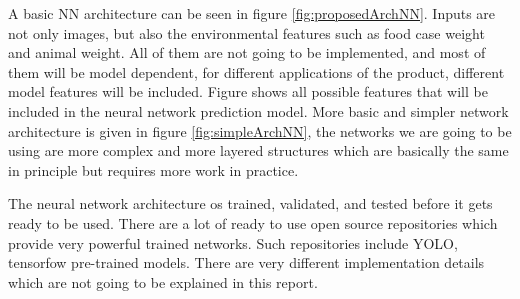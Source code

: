 A basic NN architecture can be seen in figure \ref{fig:proposedArchNN}. Inputs are not only images, but also the environmental features such as food case weight and animal weight. All of them are not going to be implemented, and most of them will be model dependent, for different applications of the product, different model features will be included. Figure shows all possible features that will be included in the neural network prediction model. More basic and simpler network architecture is given in figure \ref{fig:simpleArchNN}, the networks we are going to be using are more complex and more layered structures which are basically the same in principle but requires more work in practice.

The neural network architecture os trained, validated, and tested before it gets ready to be used. There are a lot of ready to use open source repositories which provide very powerful trained networks. Such repositories include YOLO, tensorfow pre-trained models.  There are very different implementation details which are not going to be explained in this report. 


